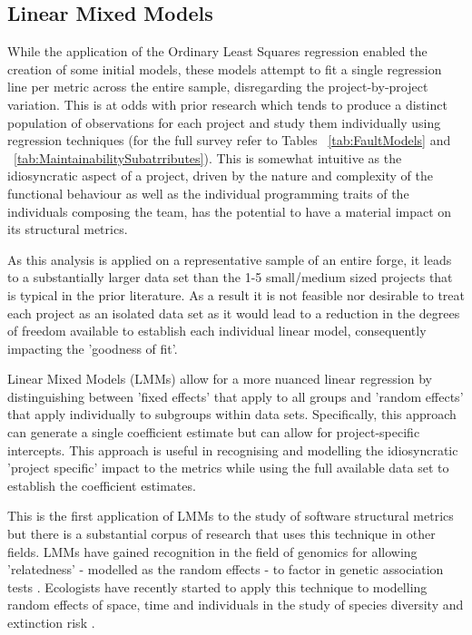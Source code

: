 \subsection{Linear Mixed Models}
While the application of the Ordinary Least Squares regression enabled the creation of some initial models, these models attempt to fit a single regression line per metric across the entire sample, disregarding the project-by-project variation. This is at odds with prior research which tends to produce a distinct population of observations for each project and study them individually using regression techniques (for the full survey refer to Tables ~\ref{tab:FaultModels} and ~\ref{tab:MaintainabilitySubatrributes}). This is somewhat intuitive as the idiosyncratic aspect of a project, driven by the nature and complexity of the functional behaviour as well as the individual programming traits of the individuals composing the team, has the potential to have a material impact on its structural metrics.

As this analysis is applied on a representative sample of an entire forge, it leads to a substantially larger data set than the 1-5 small/medium sized projects that is typical in the prior literature. As a result it is not feasible nor desirable to treat each project as an isolated data set as it would lead to a reduction in the degrees of freedom available to establish each individual linear model, consequently impacting the 'goodness of fit'.

Linear Mixed Models (LMMs) allow for a more nuanced linear regression by distinguishing between 'fixed effects' that apply to all groups and 'random effects' that apply individually to subgroups within data sets. Specifically, this approach can generate a single coefficient estimate but can allow for project-specific intercepts. This approach is useful in recognising and modelling the idiosyncratic 'project specific' impact to the metrics while using the full available data set to establish the coefficient estimates. 

This is the first application of LMMs to the study of software structural metrics but there is a substantial corpus of research that uses this technique in other fields. LMMs have gained recognition in the field of genomics for allowing 'relatedness' - modelled as the random effects - to factor in genetic association tests \citep{zhou2012genome}. Ecologists have recently started to apply this technique to modelling random effects of space, time and individuals in the study of species diversity and extinction risk \citep{bolker2009generalized}.

